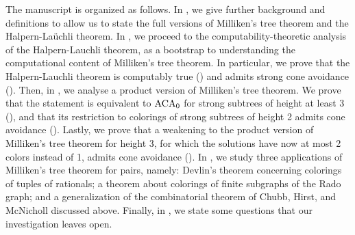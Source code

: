 The manuscript is organized as follows. In , we give further background and definitions to allow us to state the full versions of Milliken's tree theorem and the Halpern-La\"{u}chli theorem. In , we proceed to the computability-theoretic analysis of the Halpern-Lauchli theorem, as a bootstrap to understanding the computational content of Milliken's tree theorem. In particular, we prove that the Halpern-Lauchli theorem is computably true () and admits strong cone avoidance (). Then, in , we analyse a product version of Milliken's tree theorem. We prove that the statement is equivalent to $\mathrm{ACA}_0$ for strong subtrees of height at least $3$ (), and that its restriction to colorings of strong subtrees of height 2 admits cone avoidance (). Lastly, we prove that a weakening to the product version of Milliken's tree theorem for height 3, for which the solutions have now at most 2 colors instead of 1, admits cone avoidance (). In , we study three applications of Milliken's tree theorem for pairs, namely: Devlin's theorem concerning colorings of tuples of rationals; a theorem about colorings of finite subgraphs of the Rado graph; and a generalization of the combinatorial theorem of Chubb, Hirst, and McNicholl discussed above. Finally, in , we state some questions that our investigation leaves open.